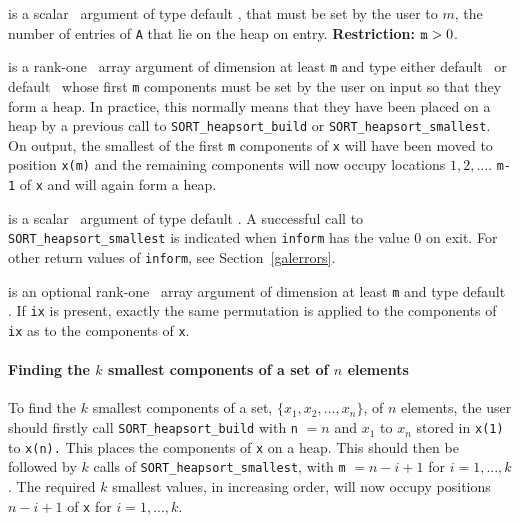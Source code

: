 \documentclass{galahad}
\newcommand{\packagename}{SORT}
\begin{document}
\vspace*{-3mm}
\begin{description}
 is a scalar \intentin\ argument of type default
\integer, that must be set by the user to $m$, the 
number of entries of {\tt A} that lie on the heap on entry. 
{\bf Restriction:} ${\tt m} > 0$. 

 is a rank-one \intentinout\ array argument of
dimension at least {\tt m} and type either default
\integer\ or default \realdp\, whose first {\tt m} components must be set by
the user on input so that they form a heap. 
In practice, this normally means that they have been placed on a heap 
by a previous call to 
{\tt \packagename\_heapsort\_build} 
or
{\tt \packagename\_heapsort\_smallest}.
On output, the smallest of the first {\tt m} components of {\tt x} will have
been moved to position {\tt x(m)} and the remaining components will now occupy 
locations $1,  2,  .... $ {\tt m-1} of {\tt x} and will again form a heap. 
 
 is a scalar \intentout\ argument of type default \integer.
A successful call to {\tt \packagename\_heapsort\_smallest}
is indicated when {\tt inform} has the value 0 on exit.
For other return values of {\tt inform}, see Section~\ref{galerrors}.

 is an optional rank-one \intentinout\ array argument of
dimension at least {\tt m} and type default \integer.
If {\tt ix} is present, exactly the same permutation is applied to the 
components of {\tt ix} as to the components of {\tt x}. 
 
\end{description}


\paragraph{Finding the $k$ smallest components of a set of $n$ elements}

To find the $k$ smallest components of a set, 
$\{ x_1 ,   x_2 ,  ...  ,  x_n \}$, of $n$ elements, the user should firstly 
call {\tt \packagename\_heapsort\_build} with {\tt n} $= n$ and $x_1 $ to 
$x_n $ stored in {\tt x(1)} to {\tt x(n).} This places the components of 
{\tt x} on a heap. This should then be followed by $k$ calls of 
{\tt \packagename\_heapsort\_smallest}, with 
{\tt m} $= n - i + 1$ for $i  =  1,  ... ,   k$. 
The required $k$ smallest values, in increasing order, will now 
occupy positions $n - i + 1$ of {\tt x} for $i  =  1,  ... ,   k$. 
 
\end{document}

